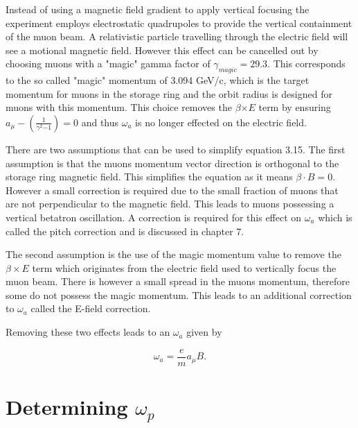Instead of using a magnetic field gradient to apply vertical focusing the experiment employs electrostatic quadrupoles to provide the vertical containment of the muon beam. A relativistic particle travelling through the electric field will see a motional magnetic field. However this effect can be cancelled out by choosing muons with a "magic" gamma factor of $\gamma_{magic} = 29.3$. This corresponds to the so called "magic" momentum of 3.094 GeV/c, which is the target momentum for muons in the storage ring and the orbit radius is designed for muons with this momentum. This choice removes the $\beta{\times{E}}$ term by ensuring $a_{\mu}-(\frac{1}{\gamma^2{-1}}) = 0$ and thus $\omega_{a}$ is no longer effected on the electric field.

There are two assumptions that can be used to simplify equation 3.15. The first assumption is that the muons momentum vector direction is orthogonal to the storage ring magnetic field. This simplifies the equation as it means $\beta{\cdot}B = 0$. However a small correction is required due to the small fraction of muons that are not perpendicular to the magnetic field. This leads to muons possessing a vertical betatron oscillation. A correction is required for this effect on $\omega_{a}$ which is called the pitch correction and is discussed in chapter 7.

The second assumption is the use of the magic momentum value to remove the $\beta{\times}E$ term which originates from the electric field used to vertically focus the muon beam. There is however a small spread in the muons momentum, therefore some do not possess the magic momentum. This leads to an additional correction to $\omega_{a}$ called the E-field correction.

Removing these two effects leads to an $\omega_{a}$ given by

\begin{equation}
\omega_{a} = \frac{e}{m}a_{\mu}B.
\end{equation}

\section{Determining $\omega_{p}$}

